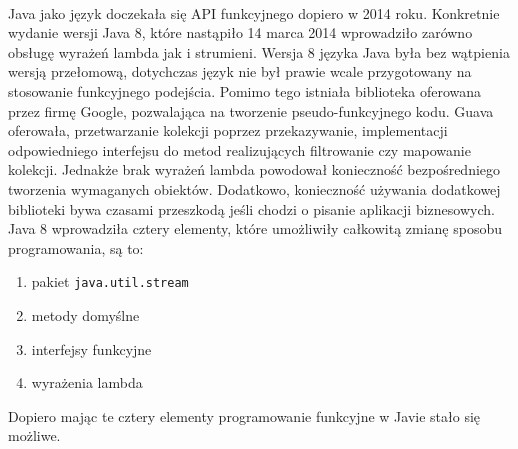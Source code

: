\documentclass[a4paper,10pt]{report}
\begin{document}
\paragraph{}
Java jako język doczekała się API funkcyjnego dopiero w 2014 roku. Konkretnie wydanie wersji Java 8, które nastąpiło 14 marca 2014 wprowadziło zarówno obsługę wyrażeń lambda jak i strumieni. Wersja 8 języka Java była bez wątpienia wersją przełomową, dotychczas język nie był prawie wcale przygotowany na stosowanie funkcyjnego podejścia. Pomimo tego istniała biblioteka oferowana przez firmę Google, pozwalająca na tworzenie pseudo-funkcyjnego kodu. Guava oferowała, przetwarzanie kolekcji poprzez  przekazywanie, implementacji odpowiedniego interfejsu do metod realizujących filtrowanie czy mapowanie kolekcji. Jednakże brak wyrażeń lambda powodował konieczność bezpośredniego tworzenia wymaganych obiektów. Dodatkowo, konieczność używania dodatkowej biblioteki bywa czasami przeszkodą jeśli chodzi o pisanie aplikacji biznesowych. 
Java 8 wprowadziła cztery elementy, które umożliwiły całkowitą zmianę sposobu programowania, są to:
\begin{enumerate}
	\item pakiet \verb|java.util.stream|
	\item metody domyślne
	\item interfejsy funkcyjne
	\item wyrażenia lambda
\end{enumerate}
Dopiero mając te cztery elementy programowanie funkcyjne w Javie stało się możliwe.
\end{document}
